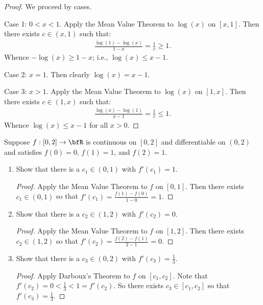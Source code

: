 \documentclass[11pt,twoside,openany]{memoir}
\begin{document}
        \begin{proof}
            We proceed by cases. \nl
            
            Case 1: $0 < x < 1$. Apply the Mean Value Theorem to $\log(x)$ on $[x,1]$. Then there exists $c \in (x,1)$ such that:
                \begin{equation*}
                \begin{split}
                    \frac{\log(1) - \log(x)}{1 - x} = \frac{1}{c} \geq 1.
                \end{split}
                \end{equation*}
            Whence $-\log(x) \geq 1-x$; i.e., $\log(x) \leq x-1$. \nl
            
            Case 2: $x = 1$. Then clearly $\log(x) = x-1$. \nl
            
            Case 3: $x > 1$. Apply the Mean Value Theorem to $\log(x)$ on $[1,x]$. Then there exists $c \in (1,x)$ such that:
                \begin{equation*}
                \begin{split}
                    \frac{\log(x) - \log(1)}{x-1} = \frac{1}{c} \leq 1.
                \end{split}
                \end{equation*}
            Whence $\log(x) \leq x-1$ for all $x > 0$.
        \end{proof}
    \newpage
    \begin{exercise}
        Suppose $f:[0,2] \rightarrow \bfR$ is continuous on $[0,2]$ and differentiable on $(0,2)$ and satisfies $f(0) = 0$, $f(1) = 1$, and $f(2) = 1$.
            \begin{enumerate}[label = (\roman*)]
                \item Show that there is a $c_1 \in (0,1)$ with $f'(c_1) = 1$.
                    \begin{proof}
                        Apply the Mean Value Theorem to $f$ on $[0,1]$. Then there exists $c_1 \in (0,1)$ so that $f'(c_1) = \frac{f(1) - f(0)}{1-0} = 1$.
                    \end{proof}
                \item Show that there is a $c_2 \in (1,2)$ with $f'(c_2) = 0$.
                    \begin{proof}
                        Apply the Mean Value Theorem to $f$ on $[1,2]$. Then there exists $c_2 \in (1,2)$ so that $f'(c_2) = \frac{f(2) - f(1)}{2-1} = 0$.
                    \end{proof}
                \item Show that there is a $c_3 \in (0,2)$ with $f'(c_3) = \frac{1}{3}$.
                    \begin{proof}
                        Apply Darboux's Theorem to $f$ on $[c_1,c_2]$. Note that $f'(c_2) = 0 < \frac{1}{3} < 1 = f'(c_2)$. So there exists $c_3 \in [c_1,c_2]$ so that $f'(c_3) = \frac{1}{3}$.
                    \end{proof}
            \end{enumerate}
    \end{exercise}
\end{document}
